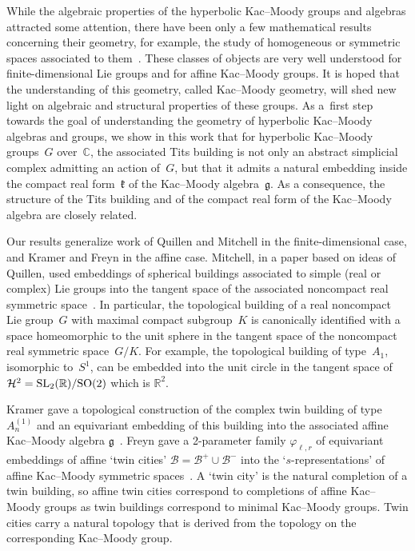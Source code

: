 \documentclass[pdftex]{sigma}
\numberwithin{equation}{section}
\def\C{{\mathbb C}}
\def\R{\mathbb{R}}
\def\cB{\mathcal B}
\def\g{\mathfrak{g}}
\def\fg{\mathfrak{g}}
\def\k{\mathfrak{k}}
\begin{document}
 While the algebraic properties of the hyperbolic Kac--Moody groups and algebras attracted some attention, there have been only a few mathematical results concerning their geometry, for example, the study of homogeneous or symmetric spaces associated to them~\cite{FreynHartnickHornKoehl17}.
These classes of objects are very well understood for finite-dimensional Lie groups and for affine Kac--Moody groups. It is hoped that the understanding of this geometry, called Kac--Moody geometry, will shed new light on algebraic and structural properties of these groups. As a~first step towards the goal of understanding the geometry of hyperbolic Kac--Moody algebras and groups, we show in this work that for
hyperbolic Kac--Moody groups~$G$ over~$\C$, the associated Tits building is not only an abstract simplicial complex admitting an action of~$G$, but that it admits a natural embedding inside the compact real form~$\k$ of the Kac--Moody algebra~$\fg$. As a consequence, the structure of the Tits building and of the compact real form of the Kac--Moody algebra are closely related.

Our results generalize work of Quillen and Mitchell in the finite-dimensional case, and Kramer and Freyn in the affine case. Mitchell, in a paper based on ideas of Quillen, used embeddings of spherical buildings associated to simple (real or complex) Lie groups into the tangent space of
the associated noncompact real symmetric space~\cite{Mitchell88}. In particular, the topological building of a real noncompact Lie group~$G$ with maximal compact subgroup~$K$ is canonically identified with a space homeomorphic to the unit sphere in the tangent space of the noncompact real symmetric space~$G/K$. For example, the topological building of type~$A_1$, isomorphic to~$S^1$, can be embedded into the unit circle in the tangent space of $\mathcal{H}^2={\rm SL}_2(\R)/{\rm SO}(2)$ which is $\R^2$.

Kramer gave a topological construction of the complex twin building of type $A_n^{(1)}$ and an equivariant embedding of this building into the associated affine Kac--Moody algebra $\g$~\cite{Kramer02}.
Freyn gave a 2-parameter family $\varphi_{\ell,r}$ of equivariant embeddings of affine `twin cities' \mbox{$\cB \!=\! \cB^+\!\cup\! \cB^-$} into the `$s$-representations' of affine Kac--Moody symmetric spaces~\cite{Freyn09, Freyn10b, Freyn10d, Freyn14, Freyn15b}. A `twin city' is the natural completion of a twin building, so affine twin cities correspond to completions of affine Kac--Moody groups as twin buildings correspond to minimal Kac--Moody groups. Twin cities carry a natural topology that is derived from the topology on the corresponding Kac--Moody group.
\end{document}
